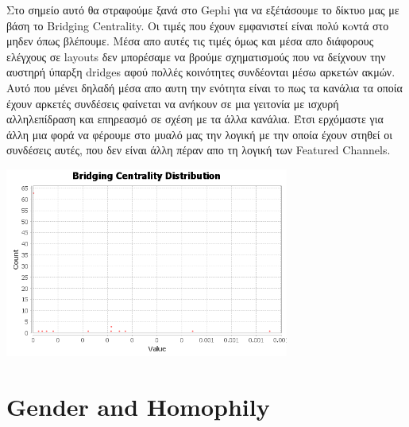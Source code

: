 \documentclass[12pt]{article}
\begin{document}
	\newpage
	Στο σημείο αυτό θα στραφούμε ξανά στο Gephi για να εξέτάσουμε το δίκτυο μας με βάση το Bridging Centrality. Οι τιμές που έχουν εμφανιστεί είναι πολύ κoντά στο μηδεν όπως βλέπουμε. Μέσα απο αυτές τις τιμές όμως και μέσα απο διάφορους ελέγχους σε layouts δεν μπορέσαμε να βρούμε σχηματισμούς που να δείχνουν την αυστηρή ύπαρξη dridges αφού πολλές κοινότητες συνδέονται μέσω αρκετών ακμών. Αυτό που μένει δηλαδή μέσα απο αυτη την ενότητα είναι το πως τα κανάλια τα οποία έχουν αρκετές συνδέσεις φαίνεται να ανήκουν σε μια γειτονία με ισχυρή αλληλεπίδραση και επηρεασμό σε σχέση με τα άλλα κανάλια. Έτσι ερχόμαστε για άλλη μια φορά να φέρουμε στο μυαλό μας την λογική με την οποία έχουν στηθεί οι συνδέσεις αυτές, που δεν είναι άλλη πέραν απο τη λογική των Featured Channels. 
	\begin{center}
		\includegraphics[width=0.7\textwidth]{photos-files/section9/BridgingCentralityDistribution.png}
	\end{center}
	\label{chap:bridges_and_local_bridges_9}
	
		
	\newpage
	\section{Gender and Homophily}
	
\end{document}
